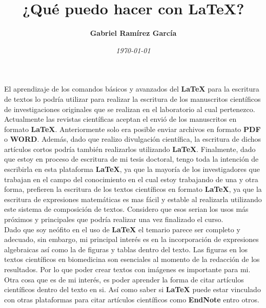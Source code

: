 \documentclass[12pt, a3paper]{article}
\title{\Huge\textbf{¿Qué puedo hacer con \LaTeX?}}
\author{\Large\textbf{Gabriel Ramírez García}}
\date{\textit{\today}}
\begin{document}
\maketitle

El aprendizaje de los comandos básicos y avanzados del \textbf{\LaTeX} para la escritura de textos lo podría utilizar para realizar la escritura de los manuscritos científicos de investigaciones originales que se realizan en el laboratorio al cual pertenezco. Actualmente las revistas científicas aceptan el envió de los manuscritos en formato \textbf{\LaTeX}. Anteriormente solo era posible enviar archivos en formato \textbf{PDF} o \textbf{WORD}.  Además, dado que realizo divulgación científica, la escritura de dichos artículos cortos podría también realizarlos utilizando \textbf{\LaTeX}. Finalmente, dado que estoy en proceso de escritura de mi tesis doctoral, tengo toda la intención de escribirla en esta plataforma \textbf{\LaTeX}, ya que la mayoría de los investigadores que trabajan en el campo del conocimiento en el cual estoy trabajando de una y otra forma, prefieren la escritura de los textos científicos en formato \textbf{\LaTeX}, ya que la escritura de expresiones matemáticas es mas fácil y estable al realizarla utilizando este sistema de composición de textos.
Considero que esos serian los usos más próximos y principales que podría realizar una vez finalizado el curso.\\


Dado que soy neófito en el uso de \textbf{\LaTeX} el temario parece ser completo y adecuado, sin embargo, mi principal interés es en la incorporación de expresiones algebraicas así como la de figuras y tablas dentro del texto. Las figuras en los textos científicos en biomedicina son esenciales al momento de la redacción de los resultados. Por lo que poder crear textos con imágenes es importante para mi. Otra cosa que es de mi interés, es poder aprender la forma de citar artículos científicos dentro del texto en si. Así como saber si \textbf{\LaTeX} puede estar vinculado con otras plataformas para citar artículos científicos como \textbf{EndNote} entro otros. 
\end{document}
